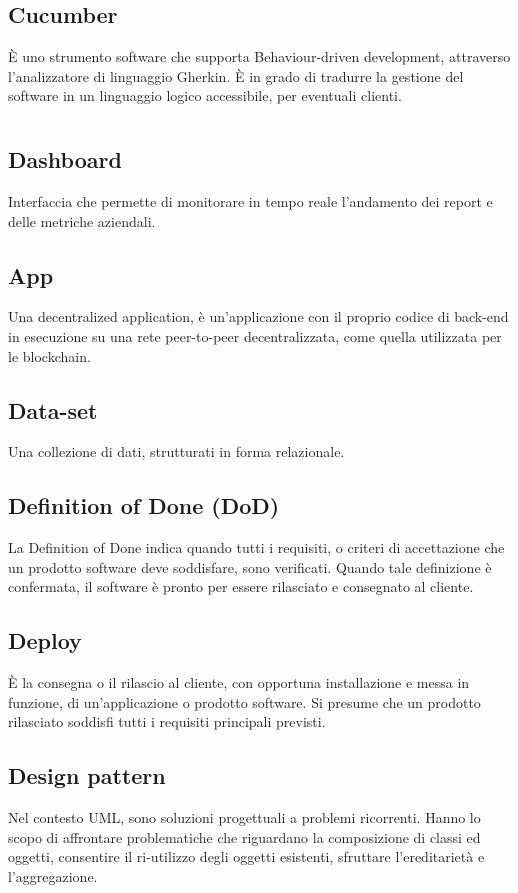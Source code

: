 	\subsection*{Cucumber}
	È uno strumento software che supporta Behaviour-driven development, attraverso l’analizzatore di linguaggio Gherkin. È in grado di tradurre la gestione del software in un linguaggio logico accessibile, per eventuali clienti. 
\pagebreak
\section[D]{}
	\subsection*{Dashboard}
	Interfaccia che permette di monitorare in tempo reale l’andamento dei report e delle metriche aziendali.
	\subsection*{\DJ{}App}
	Una decentralized application, è un’applicazione con il proprio codice di back-end in esecuzione su una rete peer-to-peer decentralizzata, come quella utilizzata per le blockchain.
	\subsection*{Data-set}
	Una collezione di dati, strutturati in forma relazionale.
	\subsection*{Definition of Done (DoD)}
	La Definition of Done indica quando tutti i requisiti, o criteri di accettazione che un prodotto software deve soddisfare, sono verificati. Quando tale definizione è confermata, il software è pronto per essere rilasciato e consegnato al cliente.
	\subsection*{Deploy}
	È la consegna o il rilascio al cliente, con opportuna installazione e messa in funzione, di un’applicazione o prodotto software. Si presume che un prodotto rilasciato soddisfi tutti i requisiti principali previsti.
	\subsection*{Design pattern}
	Nel contesto UML, sono soluzioni progettuali a problemi ricorrenti. Hanno lo scopo di affrontare problematiche che riguardano la composizione di classi ed oggetti, consentire il ri-utilizzo degli oggetti esistenti, sfruttare l’ereditarietà e l’aggregazione.
